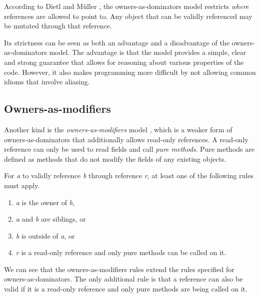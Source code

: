 \documentclass[sigplan,11pt,nonacm]{acmart}
\begin{document}
According to Dietl and Müller \cite{lightweight-ownership}, the owners-as-dominators model restricts \emph{where} references are allowed to point to.
Any object that can be validly referenced may be mutated through that reference.

Its strictness can be seen as both an advantage and a disadvantage of the owners-as-dominators model.
The advantage is that the model provides a simple, clear and strong guarantee that allows for reasoning about various properties of the code.
However, it also makes programming more difficult by not allowing common idioms that involve aliasing. \cite{ownership-types-survey}


\subsection{Owners-as-modifiers}
\label{sec:owners-as-modifiers}

Another kind is the \emph{owners-as-modifiers} model \cite{ownership-types-survey}, which is a weaker form of owners-as-dominators that additionally allows read-only references.
A read-only reference can only be used to read fields and call \emph{pure methods}.
Pure methods are defined as methods that do not modify the fields of any existing objects. \cite{ownership-types-survey}

For \emph{a} to validly reference \emph{b} through reference \emph{r}, at least one of the following rules \cite{ownership-types-survey} must apply.
\begin{enumerate}
  \item \emph{a} is the owner of \emph{b},
  \item \emph{a} and \emph{b} are siblings, or
  \item \emph{b} is outside of \emph{a}, or
  \item \emph{r} is a read-only reference and only pure methods can be called on it.
\end{enumerate}
We can see that the owners-as-modifiers rules extend the rules specified for owners-as-dominators.
The only additional rule is that a reference can also be valid if it is a read-only reference and only pure methods are being called on it.
\end{document}
